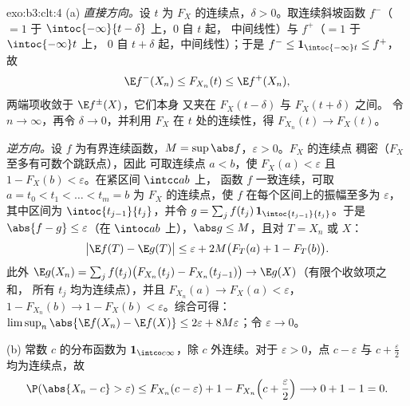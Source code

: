 \begin{solution}{exo:b3:clt:4}
(a) \emph{直接方向。}设 $t$ 为
$F_X$ 的连续点，$\delta > 0$。取连续斜坡函数
$f^-$（$= 1$ 于 $\intoc{-\infty}{t-\delta}$ 上，$0$ 自 $t$ 起，
中间线性）与 $f^+$（$= 1$ 于 $\intoc{-\infty}t$ 上，
$0$ 自 $t + \delta$ 起，中间线性）；于是 $f^- \leq
\mathbf 1_{\intoc{-\infty}t} \leq f^+$，故
\[
\E f^-(X_n) \leq F_{X_n}(t) \leq \E f^+(X_n),
\]
两端项收敛于 $\E f^\pm(X)$，它们本身
又夹在 $F_X(t - \delta)$ 与 $F_X(t + \delta)$ 之间。
令 $n \to \infty$，再令 $\delta \to 0$，并利用
$F_X$ 在 $t$ 处的连续性，得 $F_{X_n}(t) \to F_X(t)$。

\emph{逆方向。}设 $f$ 为有界连续函数，$M =
\sup\abs f$，$\varepsilon > 0$。$F_X$ 的连续点
稠密（$F_X$ 至多有可数个跳跃点），因此
可取连续点 $a < b$，使 $F_X(a) < \varepsilon$
且 $1 - F_X(b) < \varepsilon$。在紧区间 $\intcc ab$ 上，
函数 $f$ 一致连续，可取
$a = t_0 < t_1 < \dots < t_m = b$ 为 $F_X$ 的连续点，使
$f$ 在每个区间上的振幅至多为 $\varepsilon$，
其中区间为 $\intoc{t_{j-1}}{t_j}$，并令 $g = \sum_j
f(t_j)\,\mathbf 1_{\intoc{t_{j-1}}{t_j}}$。于是 $\abs{f - g}
\leq \varepsilon$（在 $\intoc ab$ 上），$\abs g \leq M$，且对
$T = X_n$ 或 $X$：
\[
\bigl|\E f(T) - \E g(T)\bigr| \leq \varepsilon +
2M\bigl(F_T(a) + 1 - F_T(b)\bigr).
\]
此外 $\E g(X_n) = \sum_j f(t_j)\bigl(F_{X_n}(t_j) -
F_{X_n}(t_{j-1})\bigr) \to \E g(X)$（有限个收敛项之和，
所有 $t_j$ 均为连续点），并且
$F_{X_n}(a) \to F_X(a) < \varepsilon$，$1 - F_{X_n}(b) \to 1
- F_X(b) < \varepsilon$。综合可得：
$\limsup_n\abs{\E f(X_n) - \E f(X)} \leq 2\varepsilon +
8M\varepsilon$；令 $\varepsilon \to 0$。

(b) 常数 $c$ 的分布函数为
$\mathbf 1_{\intco c\infty}$，除 $c$ 外连续。对于
$\varepsilon > 0$，点 $c - \varepsilon$ 与 $c +
\frac\varepsilon2$ 均为连续点，故
\[
\P(\abs{X_n - c} > \varepsilon) \leq F_{X_n}(c -
\varepsilon) + 1 - F_{X_n}\Bigl(c + \frac\varepsilon2\Bigr)
\longrightarrow 0 + 1 - 1 = 0 .
\]
\end{solution}

